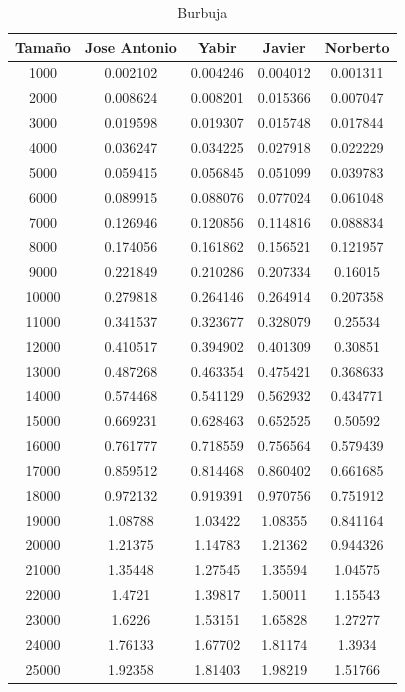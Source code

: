 \documentclass[11pt,a4paper]{article}
\begin{document}
\begin{table}[h]
	\centering
	\caption{Burbuja}
	\begin{tabular}{ | c | c  | c | c | c | }
		\hline
		Tama\~no & Jose Antonio & Yabir & Javier & Norberto\\
		\hline
		1000	&	0.002102	&	0.004246	&	0.004012	&	0.001311	\\
		2000	&	0.008624	&	0.008201	&	0.015366	&	0.007047	\\
		3000	&	0.019598	&	0.019307	&	0.015748	&	0.017844	\\
		4000	&	0.036247	&	0.034225	&	0.027918	&	0.022229	\\
		5000	&	0.059415	&	0.056845	&	0.051099	&	0.039783	\\
		6000	&	0.089915	&	0.088076	&	0.077024	&	0.061048	\\
		7000	&	0.126946	&	0.120856	&	0.114816	&	0.088834	\\
		8000	&	0.174056	&	0.161862	&	0.156521	&	0.121957	\\
		9000	&	0.221849	&	0.210286	&	0.207334	&	0.16015	\\
		10000	&	0.279818	&	0.264146	&	0.264914	&	0.207358	\\
		11000	&	0.341537	&	0.323677	&	0.328079	&	0.25534	\\
		12000	&	0.410517	&	0.394902	&	0.401309	&	0.30851	\\
		13000	&	0.487268	&	0.463354	&	0.475421	&	0.368633	\\
		14000	&	0.574468	&	0.541129	&	0.562932	&	0.434771	\\
		15000	&	0.669231	&	0.628463	&	0.652525	&	0.50592	\\
		16000	&	0.761777	&	0.718559	&	0.756564	&	0.579439	\\
		17000	&	0.859512	&	0.814468	&	0.860402	&	0.661685	\\
		18000	&	0.972132	&	0.919391	&	0.970756	&	0.751912	\\
		19000	&	1.08788	&	1.03422	&	1.08355	&	0.841164	\\
		20000	&	1.21375	&	1.14783	&	1.21362	&	0.944326	\\
		21000	&	1.35448	&	1.27545	&	1.35594	&	1.04575	\\
		22000	&	1.4721	&	1.39817	&	1.50011	&	1.15543	\\
		23000	&	1.6226	&	1.53151	&	1.65828	&	1.27277	\\
		24000	&	1.76133	&	1.67702	&	1.81174	&	1.3934	\\
		25000	&	1.92358	&	1.81403	&	1.98219	&	1.51766	\\
		\hline
	\end{tabular}
\end{table}
\end{document}
